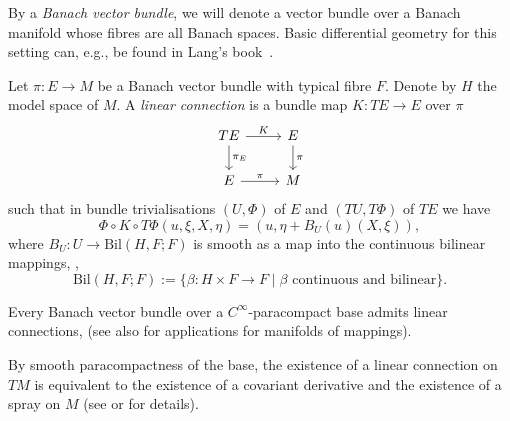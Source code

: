 By a \emph{Banach vector bundle}, we will denote a vector bundle over a Banach manifold whose fibres are all Banach spaces. Basic differential geometry for this setting can, e.g., be found in Lang's book~\cite{La01}.


\begin{Definition}\label{defn:connect_lin}
Let $\pi \colon E \rightarrow M$ be a Banach vector bundle with typical fibre $F$. Denote by $H$ the model space of $M$. A \emph{linear connection} is a bundle map $K \colon TE \rightarrow E$ over $\pi$
\begin{displaymath}\begin{tikzcd}
TE \arrow[r,"K"]\arrow[d,"\pi_E"] & E \arrow[d,"\pi"]\\
E \arrow[r,"\pi"] & M
\end{tikzcd}\end{displaymath}
such that in bundle trivialisations $(U,\Phi)$ of $E$ and $(TU,T\Phi)$ of $TE$ we have \begin{displaymath}\Phi \circ K\circ T\Phi(u,\xi, X, \eta) = (u,\eta + B_U (u)(X,\xi)),\end{displaymath} where $B_U \colon U \rightarrow \mathrm{Bil} (H,F;F)$ is smooth as a map into the continuous bilinear mappings, \mbox{\cite[Definition 1.5.9]{Kli95}}, \begin{displaymath}
 \mathrm{Bil}(H,F;F) := \{\beta \colon H \times F \rightarrow F \mid \beta \text{ continuous and bilinear}\}.
\end{displaymath}
\end{Definition}

\begin{Remark}\label{rem:ex_lincon}
Every Banach vector bundle over a $C^\infty$-paracompact base admits linear connections, \cite[Theorem 1.5.15]{Kli95} (see also \cite{Eli67} for applications for manifolds of mappings).

By smooth paracompactness of the base, the existence of a linear connection on $TM$ is equivalent to the existence of a covariant derivative and the existence of a spray on $M$ (see \mbox{\cite[Section VIII]{La01}} or \cite[Section 1.5]{Kli95} for details).
\end{Remark}

